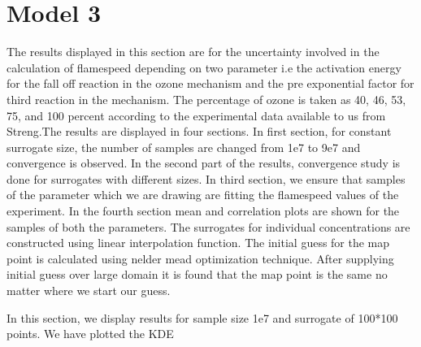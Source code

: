 \section{Model 3}

The results displayed in this section are for the uncertainty involved in the calculation of flamespeed depending  on two parameter i.e the activation energy for the fall off reaction in the ozone mechanism and the pre exponential factor for third reaction in the mechanism. The percentage of ozone is taken as 40, 46, 53, 75, and 100  percent according to the experimental data available to us from Streng\cite{Streng}.The results are displayed in four sections. In first section, for constant surrogate size, the number of samples are changed from 1e7 to 9e7 and convergence is observed. In the second part of the results, convergence study is done for surrogates with different sizes. In third section, we ensure that samples of the parameter which we are drawing are fitting the flamespeed values of the experiment. In the fourth section mean and correlation plots are shown for the samples of both the parameters. The surrogates for individual concentrations are constructed using linear interpolation function. The initial guess for the map point is calculated using nelder mead optimization technique. After supplying initial guess over large domain it is found that the map point is the same no matter where we start our guess. 


 In this section, we display results for sample size 1e7 and surrogate of 100*100 points. We  have plotted the KDE 

